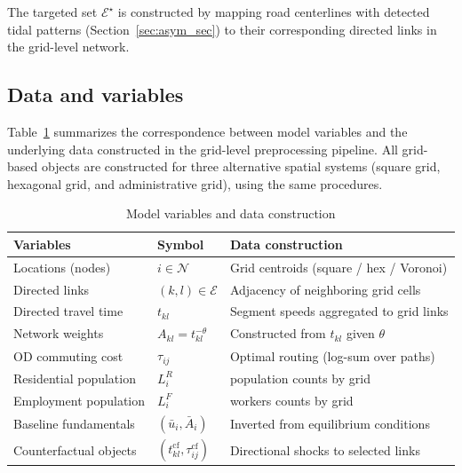 \documentclass[12pt]{article}
\begin{document}
	The targeted set $\mathcal{E}^\star$ is constructed by mapping road centerlines with detected tidal patterns (Section~\ref{sec:asym_sec}) to their corresponding directed links in the grid-level network.
	
	\subsection{Data and variables}
	Table~\ref{tab:data_mapping} summarizes the correspondence between model variables
	and the underlying data constructed in the grid-level preprocessing pipeline.
	All grid-based objects are constructed for three alternative spatial systems
	(square grid, hexagonal grid, and administrative grid), using the same procedures.
	
	\begin{table}[htbp]\centering
		\caption{Model variables and data construction}
		\label{tab:data_mapping}
		\begin{tabular}{lll}
			\hline
			Variables & Symbol & Data construction \\
			\hline
			Locations (nodes) 
			& $i\in\mathcal N$ 
			& Grid centroids (square / hex / Voronoi) \\
			
			Directed links 
			& $(k,l)\in\mathcal E$ 
			& Adjacency of neighboring grid cells \\
			
			Directed travel time 
			& $t_{kl}$ 
			& Segment speeds aggregated to grid links \\
			
			Network weights 
			& $A_{kl}=t_{kl}^{-\theta}$ 
			& Constructed from $t_{kl}$ given $\theta$ \\
			
			OD commuting cost 
			& $\tau_{ij}$ 
			& Optimal routing (log-sum over paths) \\
			
			Residential population 
			& $L_i^{R}$ 
			&  population counts by grid \\
			
			Employment population 
			& $L_i^{F}$ 
			&  workers counts by grid \\
			
			Baseline fundamentals 
			& $(\bar u_i,\bar A_i)$ 
			& Inverted from equilibrium conditions \\
			
			Counterfactual objects 
			& $(t_{kl}^{\mathrm{cf}},\tau_{ij}^{\mathrm{cf}})$ 
			& Directional shocks to selected links \\
			\hline
		\end{tabular}
	\end{table}
	
\end{document}

